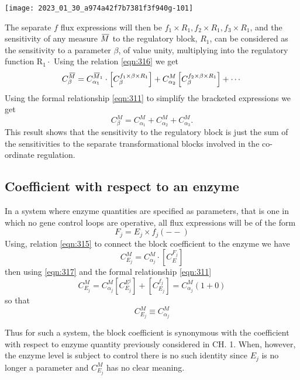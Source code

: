 \begin{center}
\texttt{[image: 2023\_01\_30\_a974a42f7b7381f3f940g-101]}
\end{center}

The separate $f$ flux expressions will then be $f_{1} \times R_{1}, f_{2} \times R_{1}, f_{3} \times R_{1}$, and the sensitivity of any measure $\,\overline{\!{M}}$ to the regulatory block, $R_{1}$, can be considered as the sensitivity to a parameter $\beta$, of value unity, multiplying into the regulatory function $\mathrm{R}_{1} \cdot$ Using the relation \eqref{eqn:316} we get
%
$$
C_{\beta}^{\,\overline{\!{M}}} = C_{\alpha_{1}}^{\,\overline{\!{M}}_{1}} \cdot \left[C_{\beta}^{f_{1} \times \beta \times R_1}\right] + C_{\alpha_{2}}^{M}\left[C_{\beta}^{f_{2} \times \beta \times R_1} \right]+\cdots
$$
%
Using the formal relationship \eqref{eqn:311}  to simplify the bracketed expressions we get
%
$$
C_{\beta}^{M} = C_{\alpha_{1}}^{M} + C_{\alpha_{2}}^{M} + C_{\alpha_{3}}^{M}.
$$
%
This result shows that the sensitivity to the regulatory block is just the sum of the sensitivities to the separate transformational blocks involved in the co-ordinate regulation.

\subsection{Coefficient with respect to an enzyme}

In a system where enzyme quantities are specified as parameters, that is one in which no gene control loops are operative, all flux expressions will be of the form
%
\begin{equation}
F_{j}=E_{j} \times f_{j}(--)
\label{eqn:317}
\end{equation}
%
Using, relation \eqref{eqn:315}  to connect the block coefficient to the enzyme we have
%
$$
C_{E_j}^{M}= C_{\alpha_{j}}^{M} \cdot\left[{C_{E}^{F_j}}\right]
$$
%
then using \eqref{eqn:317} and the formal relationship \eqref{eqn:311}
%
$$
C_{E_j}^{M} = C_{\alpha_j}^{M} \left[ C_{E_j}^{E^j} \right] + \left[ C^{f_j}_{E_j}\right] = C_{\alpha_{j}}^{M}(1+0)
$$
%
so that
%
\begin{equation}
C^M_{E_j} \equiv C^M_{\alpha_j}
\label{eqn:318}
\end{equation}

Thus for such a system, the block coefficient is synonymous with the coefficient with respect to enzyme quantity previously considered in CH. 1. When, however, the enzyme level is subject to control there is no such identity since $E_{j}$ is no longer a parameter and $C_{E_{j}}^{M}$ has no clear meaning.

